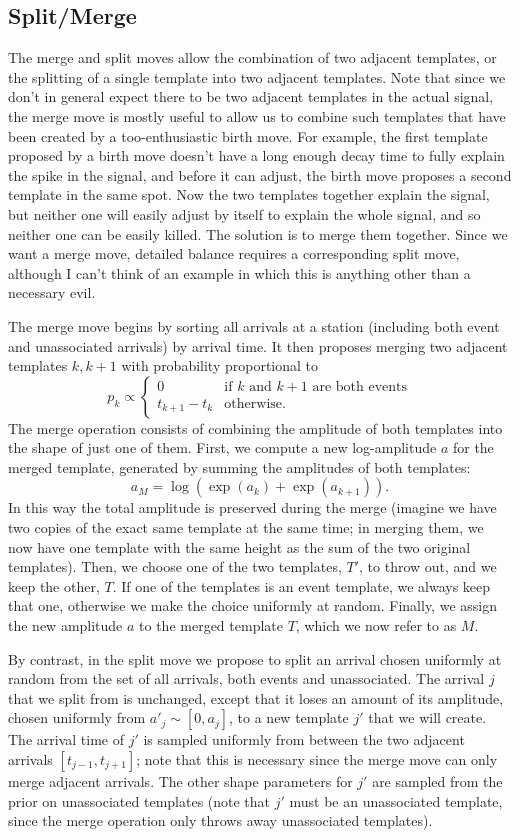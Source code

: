 \documentclass{article}
\begin{document}
\subsection{Split/Merge}

The merge and split moves allow the combination of two adjacent templates, or the splitting of a single template into two adjacent templates. Note that since we don't in general expect there to be two adjacent templates in the actual signal, the merge move is mostly useful to allow us to combine such templates that have been created by a too-enthusiastic birth move. For example, the first template proposed by a birth move doesn't have a long enough decay time to fully explain the spike in the signal, and before it can adjust, the birth move proposes a second template in the same spot. Now the two templates together explain the signal, but neither one will easily adjust by itself to explain the whole signal, and so neither one can be easily killed. The solution is to merge them together. Since we want a merge move, detailed balance requires a corresponding split move, although I can't think of an example in which this is anything other than a necessary evil. 

The merge move begins by sorting all arrivals at a station (including both event and unassociated arrivals) by arrival time. It then proposes merging two adjacent templates $k, k+1$ with probability proportional to 
\[p_k \propto \begin{cases}
   0 & \text{if $k$ and $k+1$ are both events}\\
   t_{k+1} - t_k & \text{otherwise}.
\end{cases}\]
The merge operation consists of combining the amplitude of both templates into the shape of just one of them. First, we compute a new log-amplitude $a$ for the merged template, generated by summing the amplitudes of both templates:
\[a_M = \log\left(\exp(a_k) + \exp(a_{k+1})\right).\]
In this way the total amplitude is preserved during the merge (imagine we have two copies of the exact same template at the same time; in merging them, we now have one template with the same height as the sum of the two original templates). Then, we choose one of the two templates, $T'$, to throw out, and we keep the other, $T$. If one of the templates is an event template, we always keep that one, otherwise we make the choice uniformly at random. Finally, we assign the new amplitude $a$ to the merged template $T$, which we now refer to as $M$.

By contrast, in the split move we propose to split an arrival chosen uniformly at random from the set of all arrivals, both events and unassociated. The arrival $j$ that we split from is unchanged, except that it loses an amount of its amplitude, chosen uniformly from $a'_j \sim [0, a_j]$, to a new template $j'$ that we will create. The arrival time of $j'$ is sampled uniformly from between the two adjacent arrivals $[t_{j-1}, t_{j+1}]$; note that this is necessary since the merge move can only merge adjacent arrivals. The other shape parameters for $j'$ are sampled from the prior on unassociated templates (note that $j'$ must be an unassociated template, since the merge operation only throws away unassociated templates). 
\end{document}

